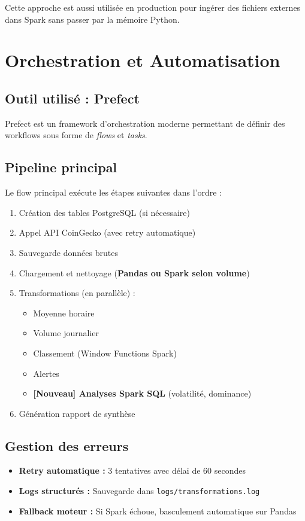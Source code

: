 \documentclass[12pt,a4paper]{article}
\begin{document}
Cette approche est aussi utilisée en production pour ingérer des fichiers externes dans Spark sans passer par la mémoire Python.

\section{Orchestration et Automatisation}

\subsection{Outil utilisé : Prefect}
Prefect est un framework d'orchestration moderne permettant de définir des workflows sous forme de \textit{flows} et \textit{tasks}.

\subsection{Pipeline principal}
Le flow principal exécute les étapes suivantes dans l'ordre :
\begin{enumerate}[noitemsep]
    \item Création des tables PostgreSQL (si nécessaire)
    \item Appel API CoinGecko (avec retry automatique)
    \item Sauvegarde données brutes
    \item Chargement et nettoyage (\textbf{Pandas ou Spark selon volume})
    \item Transformations (en parallèle) :
    \begin{itemize}[noitemsep]
        \item Moyenne horaire
        \item Volume journalier
        \item Classement (Window Functions Spark)
        \item Alertes
        \item \textbf{[Nouveau] Analyses Spark SQL} (volatilité, dominance)
    \end{itemize}
    \item Génération rapport de synthèse
\end{enumerate}

\subsection{Gestion des erreurs}
\begin{itemize}
    \item \textbf{Retry automatique :} 3 tentatives avec délai de 60 secondes
    \item \textbf{Logs structurés :} Sauvegarde dans \texttt{logs/transformations.log}
    \item \textbf{Fallback moteur :} Si Spark échoue, basculement automatique sur Pandas
\end{itemize}
\end{document}
